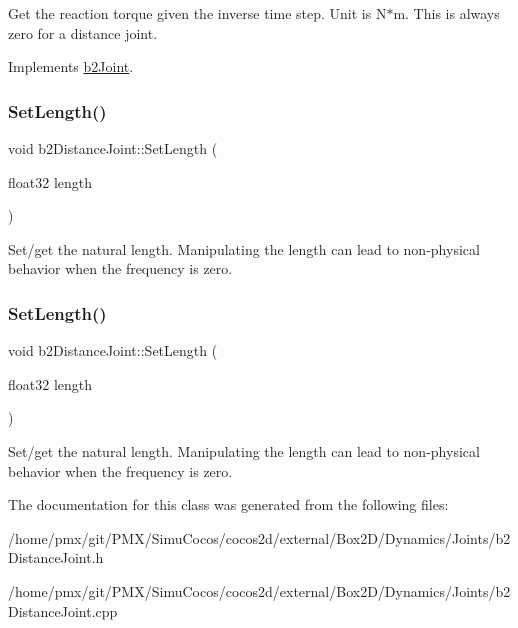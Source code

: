 Get the reaction torque given the inverse time step. Unit is N$\ast$m. This is always zero for a distance joint. 

Implements \hyperlink{classb2Joint_ae355e441c2aa842777dc04e24f15ced0}{b2\+Joint}.

\mbox{\label{classb2DistanceJoint_a950a0f187ef691208e50de40ed9223fe}} 
\subsubsection{\texorpdfstring{Set\+Length()}{SetLength()}\hspace{0.1cm}{\footnotesize\ttfamily [1/2]}}
{\footnotesize\ttfamily void b2\+Distance\+Joint\+::\+Set\+Length (\begin{DoxyParamCaption}\item[{float32}]{length }\end{DoxyParamCaption})\hspace{0.3cm}{\ttfamily [inline]}}

Set/get the natural length. Manipulating the length can lead to non-\/physical behavior when the frequency is zero. \mbox{\label{classb2DistanceJoint_a950a0f187ef691208e50de40ed9223fe}} 
\subsubsection{\texorpdfstring{Set\+Length()}{SetLength()}\hspace{0.1cm}{\footnotesize\ttfamily [2/2]}}
{\footnotesize\ttfamily void b2\+Distance\+Joint\+::\+Set\+Length (\begin{DoxyParamCaption}\item[{float32}]{length }\end{DoxyParamCaption})}

Set/get the natural length. Manipulating the length can lead to non-\/physical behavior when the frequency is zero. 

The documentation for this class was generated from the following files\+:\begin{DoxyCompactItemize}
\item 
/home/pmx/git/\+P\+M\+X/\+Simu\+Cocos/cocos2d/external/\+Box2\+D/\+Dynamics/\+Joints/b2\+Distance\+Joint.\+h\item 
/home/pmx/git/\+P\+M\+X/\+Simu\+Cocos/cocos2d/external/\+Box2\+D/\+Dynamics/\+Joints/b2\+Distance\+Joint.\+cpp\end{DoxyCompactItemize}
